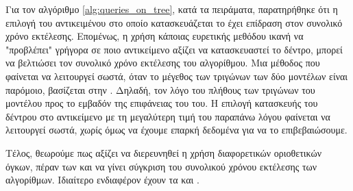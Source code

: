 Για τον αλγόριθμο \ref{alg:queries_on_tree}, κατά τα πειράματα, παρατηρήθηκε ότι 
η επιλογή του αντικειμένου στο οποίο κατασκευάζεται το  έχει 
επίδραση στον συνολικό χρόνο εκτέλεσης.
Επομένως, η χρήση κάποιας ευρετικής μεθόδου ικανή να "προβλέπει" γρήγορα
σε ποιο αντικείμενο αξίζει να κατασκευαστεί το δέντρο, μπορεί να βελτιώσει 
τον συνολικό χρόνο εκτέλεσης του αλγορίθμου. 
Μια μέθοδος που φαίνεται να λειτουργεί σωστά, όταν το μέγεθος των τριγώνων 
των δύο μοντέλων είναι παρόμοιο, βασίζεται στην .
Δηλαδή, τον λόγο του πλήθους των τριγώνων του μοντέλου προς το εμβαδόν 
της επιφάνειας του  του. 
Η επιλογή κατασκευής του δέντρου στο αντικείμενο με τη μεγαλύτερη τιμή 
του παραπάνω λόγου φαίνεται να λειτουργεί σωστά, χωρίς όμως να έχουμε 
επαρκή δεδομένα για να το επιβεβαιώσουμε.

Τέλος, θεωρούμε πως αξίζει να διερευνηθεί η χρήση διαφορετικών οριοθετικών 
όγκων, πέραν των  και να γίνει σύγκριση του συνολικού χρόνου εκτέλεσης
των αλγορίθμων.
Ιδιαίτερο ενδιαφέρον έχουν τα  και .



